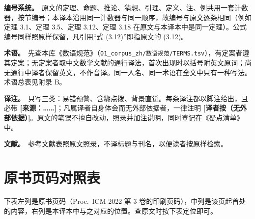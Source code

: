 \textbf{编号系统。}\ 原文的定理、命题、推论、猜想、引理、定义、注、例共用一套计数器，按节编号；本译本沿用同一计数器与同一顺序，故编号与原文逐条相同（例如定理 3.1、定理 3.5、定理 3.12、定理 3.18 在原文与本译本中是同一定理）。公式编号同样照原样保留，凡引用“式 (3.12)”即指原文的 (3.12)。

\textbf{术语。}\ 先查本库《数语规范》（\texttt{01\_corpus\_zh/数语规范/TERMS.tsv}），有定案者遵其定案；无定案者取中文数学文献的通行译法，首次出现时以括号附英文原词；尚无通行中译者保留英文，不作音译。同一人名、同一术语在全文中只有一种写法。术语总表见附录 B。

\textbf{译注。}\ 只写三类：易错预警、含糊点拨、背景直觉。每条译注都以脚注给出，且必带 \textbf{[来源：……]}；凡属译者自身体会而无外部依据者，一律注明 \textbf{[译者按（无外部依据）]}。原文的笔误不擅自改动，照录并加注说明，同时登记在《疑点清单》中。

\textbf{文献。}\ 参考文献表照原文照录，不译标题与刊名，以便读者按原样检索。

\section*{原书页码对照表}

下表左列是原书页码（Proc.\ ICM 2022 第 3 卷的印刷页码），中列是该页起首处的内容，右列是本译本中与之对应的位置。查原文时按下表定位即可。

